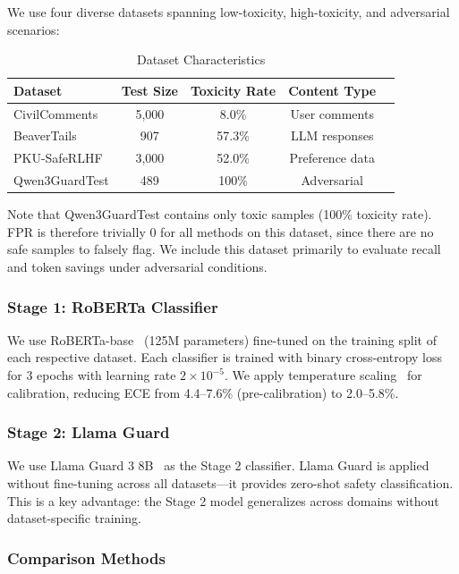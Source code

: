 \documentclass[acmtjournal, acmnowidth]{acmart}
\theoremstyle{definition}
\begin{document}
We use four diverse datasets spanning low-toxicity, high-toxicity, and adversarial scenarios:

\begin{table}[h]
\caption{Dataset Characteristics}
\label{tab:datasets}
\begin{tabular}{lcccc}
\toprule
Dataset & Test Size & Toxicity Rate & Content Type \\
\midrule
CivilComments & 5,000 & 8.0\% & User comments \\
BeaverTails & 907 & 57.3\% & LLM responses \\
PKU-SafeRLHF & 3,000 & 52.0\% & Preference data \\
Qwen3GuardTest & 489 & 100\% & Adversarial \\
\bottomrule
\end{tabular}
\end{table}

Note that Qwen3GuardTest contains only toxic samples (100\% toxicity rate). FPR is therefore trivially 0 for all methods on this dataset, since there are no safe samples to falsely flag. We include this dataset primarily to evaluate recall and token savings under adversarial conditions.

\subsubsection{Stage 1: RoBERTa Classifier}

We use RoBERTa-base~\cite{liu2019} (125M parameters) fine-tuned on the training split of each respective dataset. Each classifier is trained with binary cross-entropy loss for 3 epochs with learning rate $2 \times 10^{-5}$. We apply temperature scaling~\cite{guo2017} for calibration, reducing ECE from 4.4--7.6\% (pre-calibration) to 2.0--5.8\%.

\subsubsection{Stage 2: Llama Guard}

We use Llama Guard 3 8B~\cite{inan2023, grattafiori2024} as the Stage 2 classifier. Llama Guard is applied without fine-tuning across all datasets---it provides zero-shot safety classification. This is a key advantage: the Stage 2 model generalizes across domains without dataset-specific training.

\subsubsection{Comparison Methods}
\end{document}

